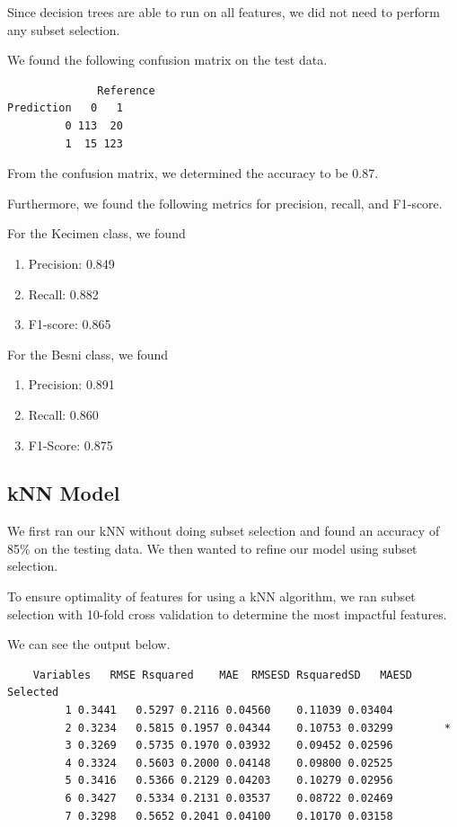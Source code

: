 \documentclass{article}
\begin{document}
Since decision trees are able to run on all features, we did not need to perform any subset selection.

We found the following confusion matrix on the test data.

\begin{verbatim}
              Reference
Prediction   0   1
         0 113  20
         1  15 123
\end{verbatim}

From the confusion matrix, we determined the accuracy to be 0.87.

Furthermore, we found the following metrics for precision, recall, and F1-score.

For the Kecimen class, we found

\begin{enumerate}
    \item Precision: 0.849

    \item Recall: 0.882

    \item F1-score: 0.865
\end{enumerate}

For the Besni class, we found

\begin{enumerate}
    \item Precision: 0.891

    \item Recall: 0.860

    \item F1-Score: 0.875
\end{enumerate}

\newpage 

\subsection{kNN Model}
We first ran our kNN without doing subset selection and found an accuracy of 85\% on the testing data. We then wanted to refine our model using subset selection.

To ensure optimality of features for using a kNN algorithm, we ran subset selection with 10-fold cross validation to determine the most impactful features.

We can see the output below.

\begin{verbatim}
    Variables   RMSE Rsquared    MAE  RMSESD RsquaredSD   MAESD Selected
         1 0.3441   0.5297 0.2116 0.04560    0.11039 0.03404         
         2 0.3234   0.5815 0.1957 0.04344    0.10753 0.03299        *
         3 0.3269   0.5735 0.1970 0.03932    0.09452 0.02596         
         4 0.3324   0.5603 0.2000 0.04148    0.09800 0.02525         
         5 0.3416   0.5366 0.2129 0.04203    0.10279 0.02956         
         6 0.3427   0.5334 0.2131 0.03537    0.08722 0.02469         
         7 0.3298   0.5652 0.2041 0.04100    0.10170 0.03158 
\end{verbatim}
\end{document}
